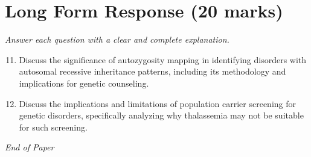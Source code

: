 \documentclass[12pt]{article}
\begin{document}
\section*{Long Form Response (20 marks)}
\textit{Answer each question with a clear and complete explanation.}
\begin{enumerate}[label=\arabic*.]
\setcounter{enumi}{10}
\item Discuss the significance of autozygosity mapping in identifying disorders with autosomal recessive inheritance patterns, including its methodology and implications for genetic counseling.
\item Discuss the implications and limitations of population carrier screening for genetic disorders, specifically analyzing why thalassemia may not be suitable for such screening.
\end{enumerate}

\vfill
\noindent\textit{End of Paper}
\end{document}
